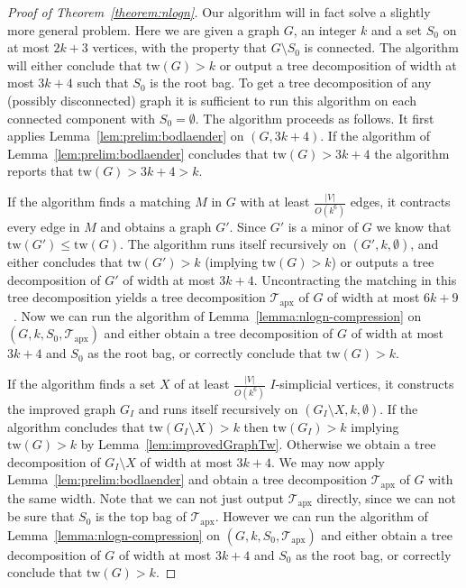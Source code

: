 \documentclass[a4paper,11pt]{article}
\theoremstyle{definition}
\theoremstyle{remark}
\newcommand{\td}{\mathcal{T}} \newcommand{\tw}{\mathrm{tw}} \newcommand{\w}{\mathrm{w}}
\newcommand{\apx}{\textrm{apx}}
\begin{document}
\begin{proof}[Proof of Theorem~\ref{theorem:nlogn}]
  Our algorithm will in fact solve a slightly more general problem.
  Here we are given a graph $G$, an integer $k$ and a set $S_0$ on at
  most $2k+3$ vertices, with the property that $G \setminus S_0$ is
  connected.  The algorithm will either conclude that $\tw(G) > k$ or
  output a tree decomposition of width at most $3k+4$ such that $S_0$
  is the root bag.  To get a tree decomposition of any (possibly
  disconnected) graph it is sufficient to run this algorithm on each
  connected component with $S_0 = \emptyset$.  The algorithm proceeds
  as follows.  It first applies Lemma~\ref{lem:prelim:bodlaender} on
  $(G, 3k+4)$.  If the algorithm of Lemma~\ref{lem:prelim:bodlaender}
  concludes that $\tw(G) > 3k+4$ the algorithm reports that $\tw(G) >
  3k+4 > k$.
  
  If the algorithm finds a matching $M$ in $G$ with at least
  $\frac{|V|}{O(k^6)}$ edges, it contracts every edge in $M$ and
  obtains a graph $G'$.  Since $G'$ is a minor of $G$ we know that
  $\tw(G') \leq \tw(G)$.  The algorithm runs itself recursively on
  $(G', k, \emptyset)$, and either concludes that $\tw(G') > k$
  (implying $\tw(G) > k$) or outputs a tree decomposition of $G'$ of
  width at most $3k+4$.  Uncontracting the matching in this tree
  decomposition yields a tree decomposition $\td_\apx$ of $G$ of width
  at most $6k+9$~\cite{Bodlaender96}.  Now we can run the algorithm of
  Lemma~\ref{lemma:nlogn-compression} on $(G,k,S_0,\td_\apx)$ and
  either obtain a tree decomposition of $G$ of width at most $3k+4$
  and $S_0$ as the root bag, or correctly conclude that $\tw(G)>k$.
  
  If the algorithm finds a set $X$ of at least $\frac{|V|}{O(k^6)}$
  $I$-simplicial vertices, it constructs the improved graph $G_I$ and
  runs itself recursively on $(G_I \setminus X, k, \emptyset)$.  If
  the algorithm concludes that $\tw(G_I \setminus X) > k$ then
  $\tw(G_I) > k$ implying $\tw(G) > k$ by
  Lemma~\ref{lem:improvedGraphTw}.  Otherwise we obtain a tree
  decomposition of $G_I \setminus X$ of width at most $3k+4$.  We may
  now apply Lemma~\ref{lem:prelim:bodlaender} and obtain a tree
  decomposition $\td_\apx$ of $G$ with the same width.  Note that we
  can not just output $\td_\apx$ directly, since we can not be sure
  that $S_0$ is the top bag of $\td_\apx$.  However we can run the
  algorithm of Lemma~\ref{lemma:nlogn-compression} on
  $(G,k,S_0,\td_\apx)$ and either obtain a tree decomposition of $G$
  of width at most $3k+4$ and $S_0$ as the root bag, or correctly
  conclude that $\tw(G)>k$.
  

\end{proof}
\end{document}
